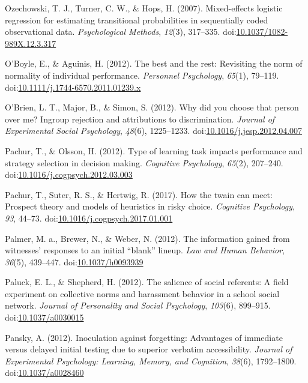 \documentclass[english,man]{apa6}
\begin{document}
\hypertarget{ref-Ozechowski2007}{}
Ozechowski, T. J., Turner, C. W., \& Hops, H. (2007). Mixed-effects
logistic regression for estimating transitional probabilities in
sequentially coded observational data. \emph{Psychological Methods},
\emph{12}(3), 317--335.
doi:\href{https://doi.org/10.1037/1082-989X.12.3.317}{10.1037/1082-989X.12.3.317}

\hypertarget{ref-OBoyle2012}{}
O'Boyle, E., \& Aguinis, H. (2012). The best and the rest: Revisiting
the norm of normality of individual performance. \emph{Personnel
Psychology}, \emph{65}(1), 79--119.
doi:\href{https://doi.org/10.1111/j.1744-6570.2011.01239.x}{10.1111/j.1744-6570.2011.01239.x}

\hypertarget{ref-OBrien2012}{}
O'Brien, L. T., Major, B., \& Simon, S. (2012). Why did you choose that
person over me? Ingroup rejection and attributions to discrimination.
\emph{Journal of Experimental Social Psychology}, \emph{48}(6),
1225--1233.
doi:\href{https://doi.org/10.1016/j.jesp.2012.04.007}{10.1016/j.jesp.2012.04.007}

\hypertarget{ref-Pachur2012}{}
Pachur, T., \& Olsson, H. (2012). Type of learning task impacts
performance and strategy selection in decision making. \emph{Cognitive
Psychology}, \emph{65}(2), 207--240.
doi:\href{https://doi.org/10.1016/j.cogpsych.2012.03.003}{10.1016/j.cogpsych.2012.03.003}

\hypertarget{ref-Pachur2017}{}
Pachur, T., Suter, R. S., \& Hertwig, R. (2017). How the twain can meet:
Prospect theory and models of heuristics in risky choice.
\emph{Cognitive Psychology}, \emph{93}, 44--73.
doi:\href{https://doi.org/10.1016/j.cogpsych.2017.01.001}{10.1016/j.cogpsych.2017.01.001}

\hypertarget{ref-Palmer2012}{}
Palmer, M. a., Brewer, N., \& Weber, N. (2012). The information gained
from witnesses' responses to an initial ``blank'' lineup. \emph{Law and
Human Behavior}, \emph{36}(5), 439--447.
doi:\href{https://doi.org/10.1037/h0093939}{10.1037/h0093939}

\hypertarget{ref-Paluck2012}{}
Paluck, E. L., \& Shepherd, H. (2012). The salience of social referents:
A field experiment on collective norms and harassment behavior in a
school social network. \emph{Journal of Personality and Social
Psychology}, \emph{103}(6), 899--915.
doi:\href{https://doi.org/10.1037/a0030015}{10.1037/a0030015}

\hypertarget{ref-Pansky2012}{}
Pansky, A. (2012). Inoculation against forgetting: Advantages of
immediate versus delayed initial testing due to superior verbatim
accessibility. \emph{Journal of Experimental Psychology: Learning,
Memory, and Cognition}, \emph{38}(6), 1792--1800.
doi:\href{https://doi.org/10.1037/a0028460}{10.1037/a0028460}
\end{document}
